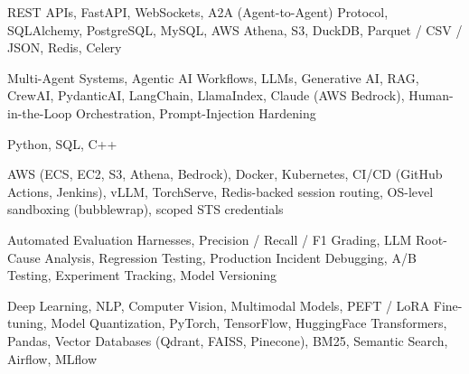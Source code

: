 \documentclass[letter,10pt]{article}
\begin{document}
 REST APIs, FastAPI, WebSockets, A2A (Agent-to-Agent) Protocol, SQLAlchemy, PostgreSQL, MySQL, AWS Athena, S3, DuckDB, Parquet / CSV / JSON, Redis, Celery\par\vspace{2pt}

 Multi-Agent Systems, Agentic AI Workflows, LLMs, Generative AI, RAG, CrewAI, PydanticAI, LangChain, LlamaIndex, Claude (AWS Bedrock), Human-in-the-Loop Orchestration, Prompt-Injection Hardening\par\vspace{2pt}

 Python, SQL, C++\par\vspace{2pt}

 AWS (ECS, EC2, S3, Athena, Bedrock), Docker, Kubernetes, CI/CD (GitHub Actions, Jenkins), vLLM, TorchServe, Redis-backed session routing, OS-level sandboxing (bubblewrap), scoped STS credentials\par\vspace{2pt}

 Automated Evaluation Harnesses, Precision / Recall / F1 Grading, LLM Root-Cause Analysis, Regression Testing, Production Incident Debugging, A/B Testing, Experiment Tracking, Model Versioning\par\vspace{2pt}

 Deep Learning, NLP, Computer Vision, Multimodal Models, PEFT / LoRA Fine-tuning, Model Quantization, PyTorch, TensorFlow, HuggingFace Transformers, Pandas, Vector Databases (Qdrant, FAISS, Pinecone), BM25, Semantic Search, Airflow, MLflow
\end{document}

